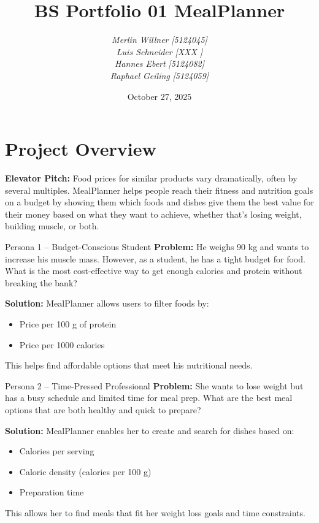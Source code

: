 \documentclass[11pt]{article}
\title{BS Portfolio 01 MealPlanner}
\author{
  \textit{Merlin Willner} \textit{[5124045]}\\
  \textit{Luis Schneider} \textit{[XXX ]}\\
  \textit{Hannes Ebert} \textit{[5124082]}\\
  \textit{Raphael Geiling} \textit{[5124059]}
}
\date{October 27, 2025}
\begin{document}
\maketitle

\section{Project Overview}

\textbf{Elevator Pitch:} Food prices for similar products vary dramatically, often by several multiples. 
MealPlanner helps people reach their fitness and nutrition goals on a budget by showing them which foods and dishes give them the best value for their money based on what they want to achieve, whether that's losing weight, building muscle, or both.

\begin{personabox}{Persona 1 -- Budget-Conscious Student}
\textbf{Problem:} He weighs 90 kg and wants to increase his muscle mass. However, as a student, he has a tight budget for food. 
What is the most cost-effective way to get enough calories and protein without breaking the bank?

\textbf{Solution:} MealPlanner allows users to filter foods by:
\begin{itemize}[noitemsep]
  \item Price per 100 g of protein
  \item Price per 1000 calories
\end{itemize}
This helps find affordable options that meet his nutritional needs.
\end{personabox}

\begin{personabox}{Persona 2 -- Time-Pressed Professional}
\textbf{Problem:} She wants to lose weight but has a busy schedule and limited time for meal prep. What are the best meal options that are both healthy and quick to prepare?

\textbf{Solution:} MealPlanner enables her to create and search for dishes based on:
\begin{itemize}[noitemsep]
  \item Calories per serving
  \item Caloric density (calories per 100 g)
  \item Preparation time
\end{itemize}
This allows her to find meals that fit her weight loss goals and time constraints.
\end{personabox}
\end{document}

